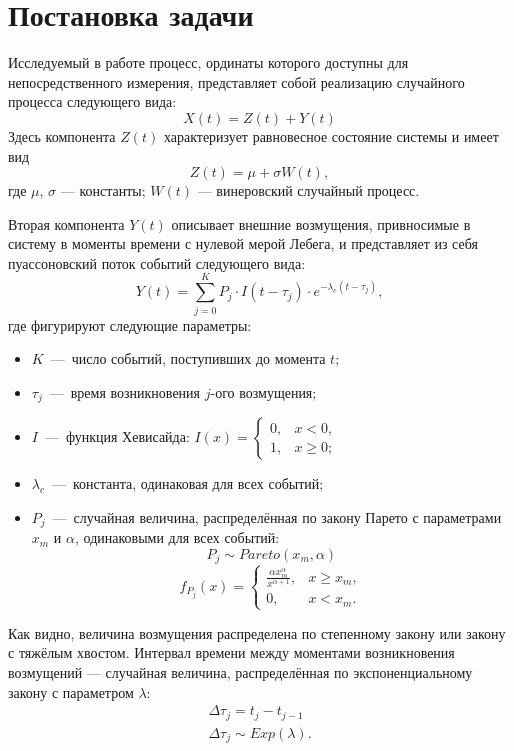 \setcounter{chapter}{0}
\chapter{Постановка задачи}	%

Исследуемый в работе процесс, ординаты которого доступны для непосредственного измерения, представляет собой реализацию случайного процесса следующего вида:
\begin{equation}\label{eq:model}
X(t) = Z(t) + Y(t)
\end{equation}
Здесь компонента $Z(t)$ характеризует равновесное состояние системы и имеет вид
\begin{equation}\label{eq:mod_wiener}
Z(t) = \mu + \sigma W(t),
\end{equation}
где
$\mu$, $\sigma$ --- константы; $W(t)$ --- винеровский случайный процесс.

Вторая компонента $Y(t)$ описывает внешние возмущения, привносимые в систему в моменты времени с нулевой мерой Лебега, и представляет из себя пуассоновский поток событий следующего вида:
\begin{equation}\label{eq:mod_markovsky}
Y(t) = \sum_{j = 0}^K P_j \cdot I(t - \tau_j) \cdot e^{-\lambda_c(t - \tau_j)},
\end{equation}
где фигурируют следующие параметры:
\begin{itemize}
\item $K$~---~число событий, поступивших до момента $t$;
\item $\tau_j$~---~время возникновения $j$-ого возмущения;
\item $I$~---~функция Хевисайда: $I(x) = \begin{cases}
0, &x < 0, \\
1, &x \geq 0;
\end{cases}$
\item $\lambda_c$~---~константа, одинаковая для всех событий;
\item $P_j$~---~случайная величина, распределённая по закону Парето с параметрами $x_m$ и $\alpha$, одинаковыми для всех событий:
\[ P_j \sim Pareto(x_m, \alpha) \]
\[
f_{P_j}(x) = \begin{cases}
\frac{\alpha x_m^\alpha}{x^{\alpha+1} }, &x \geqslant x_m, \\
0, &x < x_m.
\end{cases}
\]
\end{itemize}
Как видно, величина возмущения распределена по степенному закону или закону с тяжёлым хвостом.
Интервал времени между моментами возникновения возмущений --- случайная величина, распределённая по экспоненциальному закону с параметром $\lambda$:
\begin{gather}
\Delta \tau_j = t_j - t_{j-1} \\
\Delta \tau_j \sim Exp(\lambda).
\end{gather}

